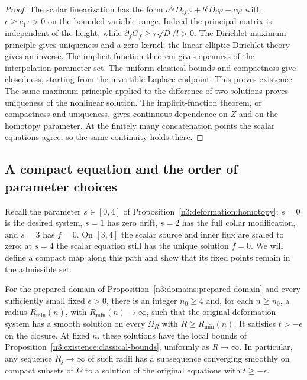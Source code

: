 \begin{proof}
The scalar linearization has the form
$a^{ij}D_{ij}\varphi+b^iD_i\varphi-c\varphi$ with
$c\ge c_1\tau>0$ on the bounded variable range.  Indeed the
principal matrix is independent of the height, while
$\partial_fG_f\ge\tau\sqrt D/l>0$.
The Dirichlet maximum principle gives uniqueness and a zero kernel;
the linear elliptic Dirichlet theory gives an inverse.  The
implicit-function theorem gives openness of the interpolation
parameter set.  The uniform classical bounds and compactness give
closedness, starting from the invertible Laplace endpoint.  This
proves existence.  The same maximum principle applied to the
difference of two solutions proves uniqueness of the nonlinear
solution.  The implicit-function theorem, or compactness and
uniqueness, gives continuous dependence on $Z$ and on the
homotopy parameter.  At the finitely many concatenation points the
scalar equations agree, so the same continuity holds there.
\end{proof}


\subsection{A compact equation and the order of parameter choices}

Recall the parameter $s\in[0,4]$ of
Proposition~\ref{n3:deformation:homotopy}: $s=0$ is the desired system,
$s=1$ has zero drift, $s=2$ has the full collar modification, and
$s=3$ has $f=0$. On $[3,4]$ the scalar source and inner flux are scaled
to zero; at $s=4$ the scalar equation still has the unique solution
$f=0$. We will define a compact map along this path and show that its
fixed points remain in the admissible set.

\begin{theorem}
\label{n3:existence:deformation}
For the prepared domain of Proposition~\ref{n3:domains:prepared-domain}
and every sufficiently small fixed $\epsilon>0$, there is an
integer $n_0\ge4$ and, for each $n\ge n_0$, a radius
$R_{\min}(n)$, with $R_{\min}(n)\to\infty$, such that the original
deformation system has a smooth solution on every $\Omega_R$ with
$R\ge R_{\min}(n)$.  It satisfies $t>-\epsilon$ on the closure.
At fixed $n$, these solutions have the local bounds of
Proposition~\ref{n3:existence:classical-bounds}, uniformly as
$R\to\infty$.  In particular, any sequence $R_j\to\infty$ of such radii has a
subsequence converging smoothly on compact subsets of
$\overline\Omega$ to a solution of the original equations with
$t\ge-\epsilon$.
\end{theorem}


